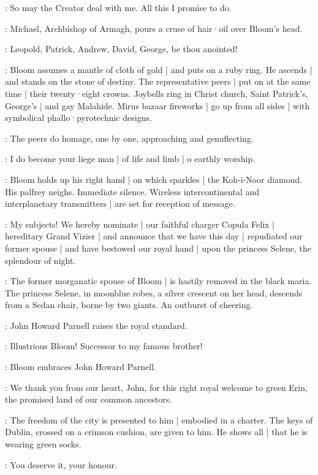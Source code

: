 \Bloom:
So may the Creator deal with me.
All this I promise to do.

:
Michael,
Archbishop of Armagh,
pours a cruse of hair·oil over Bloom's head.

\MikeArmagh:
Leopold,
Patrick,
Andrew,
David,
George,
be thou anointed!

:
Bloom assumes a mantle of cloth of gold |
and puts on a ruby ring.
He ascends |
and stands on the stone of destiny.
The representative peers |
put on at the same time |
their twenty·eight crowns.
Joybells ring in Christ church,
Saint Patrick's,
George's |
and gay Malahide.
Mirus bazaar fireworks |
go up from all sides |
with symbolical phallo·pyrotechnic designs.

:
The peers do homage,
one by one,
approaching and genuflecting.

\Peers:
I do become your liege man |
of life and limb  |
o earthly worship.

:
Bloom holds up his right hand |
on which sparkles |
the Koh-i-Noor diamond.
His palfrey neighs.
Immediate silence.
Wireless intercontinental and interplanetary transmitters |
are set for reception of message.

\Bloom:
My subjects!
We hereby nominate |
our faithful charger Copula Felix |
hereditary Grand Vizier |
and announce that we have this day |
repudiated our former spouse |
and have bestowed our royal hand |
upon the princess Selene,
the splendour of night.

:
The former morganatic spouse of Bloom |
is hastily removed in the black maria.
The princess Selene,
in moonblue robes,
a silver crescent on her head,
descends from a Sedan chair,
borne by two giants.
An outburst of cheering.

:
John Howard Parnell raises the royal standard.

\Parnell:
Illustrious Bloom!
Successor to my famous brother!

:
Bloom embraces John Howard Parnell.

\Bloom:
We thank you from our heart,
John,
for this right royal welcome to green Erin,
the promised land of our common ancestors.

:
The freedom of the city is presented to him |
embodied in a charter.
The keys of Dublin,
crossed on a crimson cushion,
are given to him.%
He shows all |
that he is wearing green socks.

\Kernan[2]:
You deserve it,
your honour.

